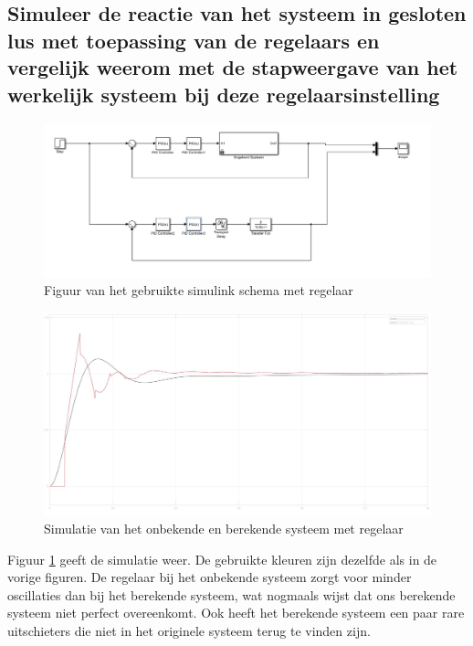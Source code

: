 \documentclass[a4paper, 12pt]{article}
\begin{document}
\newpage

\subsection{Simuleer de reactie van het systeem in gesloten lus met toepassing van de regelaars en vergelijk weerom met de stapweergave van het werkelijk systeem bij deze regelaarsinstelling}

\begin{figure}[!h]
	\includegraphics[width=1\linewidth]{Labo1_4_systeem.jpg}
	\caption{Figuur van het gebruikte simulink schema met regelaar}
\end{figure}

\begin{figure}[!h]
	\includegraphics[width=1\linewidth]{Labo1_4_scoop.jpg}
	\caption{Simulatie van het onbekende en berekende systeem met regelaar}
	\label{fig:scoop4.1}
\end{figure}

Figuur \ref{fig:scoop4.1} geeft de simulatie weer. De gebruikte kleuren zijn dezelfde als in de vorige figuren. De regelaar bij het onbekende systeem zorgt voor minder oscillaties dan bij het berekende systeem, wat nogmaals wijst dat ons berekende systeem niet perfect overeenkomt. Ook heeft het berekende systeem een paar rare uitschieters die niet in het originele systeem terug te vinden zijn.
\end{document}
